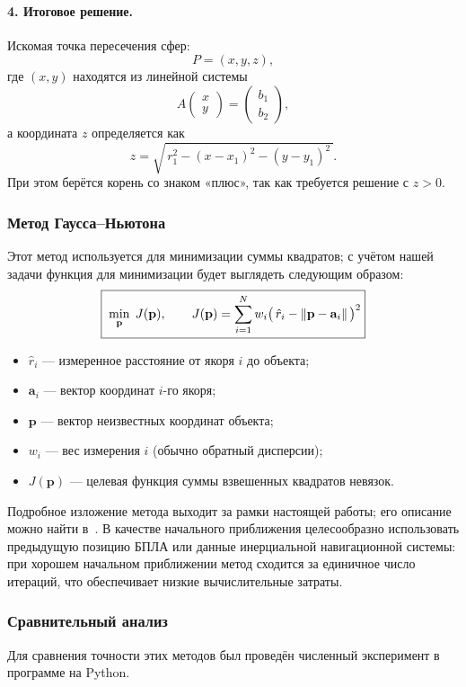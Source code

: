 \paragraph{4. Итоговое решение.}
Искомая точка пересечения сфер:
\[
P = (x, y, z),
\]
где \((x,y)\) находятся из линейной системы
\[
A\begin{pmatrix}x\\y\end{pmatrix} = \begin{pmatrix}b_1\\b_2\end{pmatrix},
\]
а координата \(z\) определяется как
\[
z = \sqrt{\,r_1^2 - (x - x_1)^2 - (y - y_1)^2\,}.
\]
При этом берётся корень со знаком «плюс», так как требуется решение с \(z>0\).

\subsubsection{Метод Гаусса--Ньютона}

Этот метод используется для минимизации суммы квадратов; с учётом нашей задачи
функция для минимизации будет выглядеть следующим образом:
\[
\boxed{%
\; \min_{\mathbf{p}}\; J(\mathbf{p}), \qquad
J(\mathbf{p}) = \sum_{i=1}^{N} w_i\bigl(\,\hat r_i - \|\mathbf{p}-\mathbf{a}_i\|\,\bigr)^2
}
\]
\begin{itemize}
  \item $\hat r_i$ \;— измеренное расстояние от якоря $i$ до объекта;
  \item $\mathbf{a}_i$ \;— вектор координат $i$-го якоря;
  \item $\mathbf{p}$ \;— вектор неизвестных координат объекта;
  \item $w_i$ \;— вес измерения $i$ (обычно обратный дисперсии);
  \item $J(\mathbf{p})$ \;— целевая функция суммы взвешенных квадратов невязок.
\end{itemize}

Подробное изложение метода выходит за рамки настоящей работы; его описание можно найти в~\cite{nocedal2006}.
В качестве начального приближения целесообразно использовать предыдущую позицию БПЛА
или данные инерциальной навигационной системы: при хорошем начальном приближении метод
сходится за единичное число итераций, что обеспечивает низкие вычислительные затраты.

\subsubsection{Сравнительный анализ}
Для сравнения точности этих методов был проведён численный эксперимент в программе на Python.

